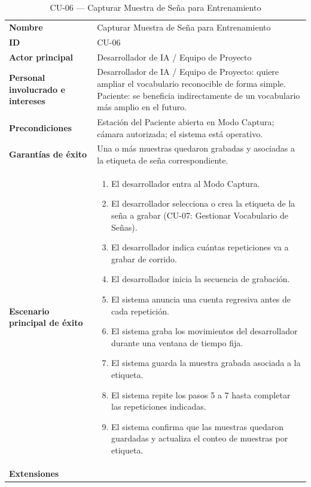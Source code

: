 \begin{longtable}{@{}>{\raggedright\arraybackslash}p{4.1cm} >{\raggedright\arraybackslash}p{\dimexpr\textwidth-4.1cm-2\tabcolsep\relax}@{}}
\caption{CU-06 --- Capturar Muestra de Seña para Entrenamiento}\\
\toprule
\textbf{Nombre} & Capturar Muestra de Seña para Entrenamiento \\
\textbf{ID} & CU-06 \\
\textbf{Actor principal} & Desarrollador de IA / Equipo de Proyecto \\
\textbf{Personal involucrado e intereses} &
Desarrollador de IA / Equipo de Proyecto: quiere ampliar el vocabulario
reconocible de forma simple. \newline
Paciente: se beneficia indirectamente de un vocabulario más amplio en el
futuro. \\
\textbf{Precondiciones} &
Estación del Paciente abierta en Modo Captura; cámara autorizada; el
sistema está operativo. \\
\textbf{Garantías de éxito} &
Una o más muestras quedaron grabadas y asociadas a la etiqueta de seña
correspondiente. \\
\textbf{Escenario principal de éxito} &
\begin{enumerate}[leftmargin=*, itemsep=2pt]
    \item El desarrollador entra al Modo Captura.
    \item El desarrollador selecciona o crea la etiqueta de la seña a
    grabar (CU-07: Gestionar Vocabulario de Señas).
    \item El desarrollador indica cuántas repeticiones va a grabar de
    corrido.
    \item El desarrollador inicia la secuencia de grabación.
    \item El sistema anuncia una cuenta regresiva antes de cada
    repetición.
    \item El sistema graba los movimientos del desarrollador durante una
    ventana de tiempo fija.
    \item El sistema guarda la muestra grabada asociada a la etiqueta.
    \item El sistema repite los pasos 5 a 7 hasta completar las
    repeticiones indicadas.
    \item El sistema confirma que las muestras quedaron guardadas y
    actualiza el conteo de muestras por etiqueta.
\end{enumerate} \\
\textbf{Extensiones} &

\end{longtable}
